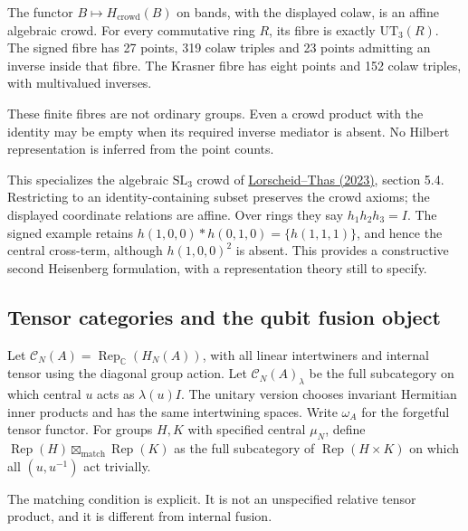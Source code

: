 \begin{proposition}
{\normalfont\statusSketch}\quad The functor $B\mapsto H_{\mathrm{crowd}}(B)$
on bands, with the displayed colaw, is an affine algebraic crowd.
For every commutative ring $R$, its fibre is exactly $\mathrm{UT}_3(R)$.
The signed fibre has 27 points, 319 colaw triples and 23 points admitting
an inverse inside that fibre. The Krasner fibre has eight points and
152 colaw triples, with multivalued inverses.
\end{proposition}
\begin{scope}These finite fibres are not ordinary groups. Even a crowd
product with the identity may be empty when its required inverse mediator
is absent. No Hilbert representation is inferred from the point counts.\end{scope}

This specializes the algebraic $\mathrm{SL}_3$ crowd of
\href{https://arxiv.org/abs/2305.13809}{Lorscheid--Thas (2023)}, section 5.4.
Restricting to an identity-containing subset preserves the crowd axioms;
the displayed coordinate relations are affine. Over rings they say
$h_1h_2h_3=I$. The signed example retains
$h(1,0,0)*h(0,1,0)=\{h(1,1,1)\}$, and hence the central cross-term,
although $h(1,0,0)^2$ is absent. This provides a constructive second
Heisenberg formulation, with a representation theory still to specify.

\subsection{Tensor categories and the qubit fusion object}

\begin{definition}
Let $\mathcal C_N(A)=\operatorname{Rep}_{\mathbb C}(H_N(A))$, with all
linear intertwiners and internal tensor using the diagonal group action.
Let $\mathcal C_N(A)_\lambda$ be the full subcategory on which central
$u$ acts as $\lambda(u)I$. The unitary version chooses invariant Hermitian
inner products and has the same intertwining spaces. Write $\omega_A$
for the forgetful tensor functor. For groups $H,K$ with specified central
$\mu_N$, define
$\operatorname{Rep}(H)\boxtimes_{\mathrm{match}}\operatorname{Rep}(K)$
as the full subcategory of $\operatorname{Rep}(H\times K)$ on which all
$(u,u^{-1})$ act trivially.
\end{definition}
\begin{scope}The matching condition is explicit. It is not an
unspecified relative tensor product, and it is different from internal fusion.\end{scope}

